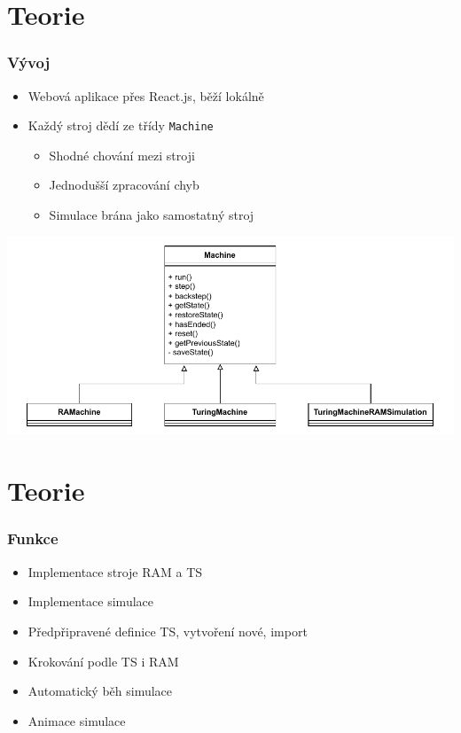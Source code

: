 \documentclass{beamer}
\begin{document}
\section{Teorie}
\begin{frame}
	\frametitle{Vývoj}
    \begin{itemize}
        \item Webová aplikace přes React.js, běží lokálně
        \item Každý stroj dědí ze třídy \texttt{Machine}
        \begin{itemize}
            \item Shodné chování mezi stroji
            \item Jednodušší zpracování chyb
            \item Simulace brána jako samostatný stroj
        \end{itemize}
    \end{itemize}
    \bigskip
    \begin{center}
        \includegraphics[height=0.5\textheight]{fig/class_diagram.drawio.pdf}
    \end{center}
\end{frame}

\section{Teorie}
\begin{frame}
	\frametitle{Funkce}
    \begin{itemize}
        \item Implementace stroje RAM a TS
        \item Implementace simulace
        \item Předpřipravené definice TS, vytvoření nové, import
        \item Krokování podle TS i RAM
        \item Automatický běh simulace
        \item Animace simulace
    \end{itemize}
\end{frame}
\end{document}
